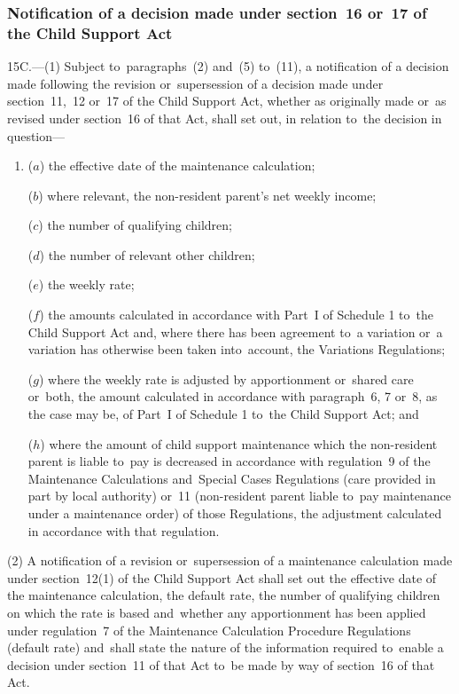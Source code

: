 \documentclass[12pt,a4paper]{article}
\begin{document}
{\subsubsection[15C. Notification of a decision made under section~16 or~17 of the Child Support Act]{Notification of a decision made under section~16 or~17 of the Child Support Act}

15C.---(1)  Subject to~paragraphs~(2) and~(5) to~(11), a notification of a decision made following the revision or~supersession of a decision made under section~11,~12 or~17 of the Child Support Act, whether as originally made or~as revised under section~16 of that Act, shall set out, in relation to~the decision in question—
\begin{enumerate}\item[]
($a$) the effective date of the maintenance calculation;

($b$) where relevant, the non-resident parent’s net weekly income;

($c$) the number of qualifying children;

($d$) the number of relevant other children;

($e$) the weekly rate;

($f$) the amounts calculated in accordance with Part~I of Schedule 1 to~the Child Support Act and, where there has been agreement to~a variation or~a variation has otherwise been taken into~account, the Variations Regulations;

($g$) where the weekly rate is adjusted by apportionment or~shared care or~both, the amount calculated in accordance with paragraph~6, 7 or~8, as the case may be, of Part~I of Schedule 1 to~the Child Support Act; and

($h$) where the amount of child support maintenance which the non-resident parent is liable to~pay is decreased in accordance with regulation~9 of the Maintenance Calculations and~Special Cases Regulations (care provided in part by local authority) or~11 (non-resident parent liable to~pay maintenance under a maintenance order) of those Regulations, the adjustment calculated in accordance with that regulation.
\end{enumerate}

(2) A notification of a revision or~supersession of a maintenance calculation made under section~12(1) of the Child Support Act shall set out the effective date of the maintenance calculation, the default rate, the number of qualifying children on which the rate is based and~whether any apportionment has been applied under regulation~7 of the Maintenance Calculation Procedure Regulations (default rate) and~shall state the nature of the information required to~enable a decision under section~11 of that Act to~be made by way of section~16 of that Act.

}
\end{document}
